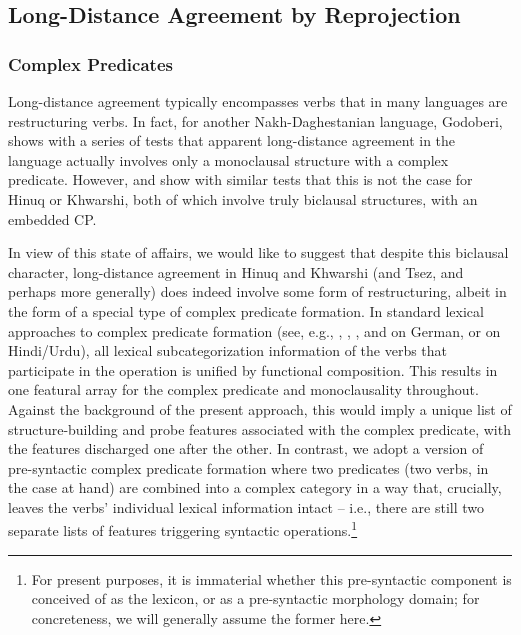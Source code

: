 \documentclass[output=paper
,modfonts
,nonflat]{langsci/langscibook}
\begin{document}
\subsection{Long-Distance Agreement by Reprojection}

\subsubsection{Complex Predicates}

Long-distance agreement typically encompasses verbs that in many
languages are restructuring verbs.  In fact, for another
Nakh-Daghestanian language, Godoberi, \cite{Haspelmath99} shows with a
series of tests that apparent long-distance agreement in the language
actually involves only a monoclausal structure with a complex
predicate.  However, \citet{Forker:11} and \citet{Khalilova09} show
with similar tests that this is not the case for Hinuq or Khwarshi,
both of which involve truly biclausal structures, with an embedded CP.

In view of this state of affairs, we would like to suggest that
despite this biclausal character, long-distance agreement in Hinuq and
Khwarshi (and Tsez, and perhaps more generally) does indeed involve
some form of restructuring, albeit in the form of a special type of
complex predicate formation. In standard lexical approaches to complex
predicate formation (see, e.g., \cite{Haider:93,Haider:10},
\cite{Kiss:95}, \cite{Stiebels:96}, and  on
German, or \cite{Butt:95} on Hindi/Urdu), all lexical
subcategorization information of the verbs that participate in the
operation is unified by functional composition.  This results in one
featural array for the complex predicate and monoclausality
throughout. Against the background of the present approach, this would
imply a unique list of structure-building and probe features
associated with the complex predicate, with the features discharged
one after the other. In contrast, we adopt a version of pre-syntactic
complex predicate formation where two predicates (two verbs, in the
case at hand) are combined into a complex category in a way that, crucially,
leaves the verbs' individual lexical information intact -- i.e., there
are still two separate lists of features triggering syntactic
operations.\footnote{For present purposes, it is immaterial whether
  this pre-syntactic component is conceived of as the lexicon, or as a
  pre-syntactic morphology domain; for concreteness, we will generally assume
  the former here.}
\end{document}
